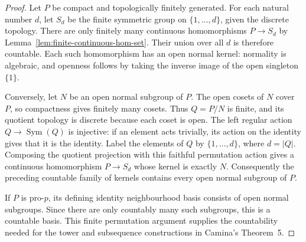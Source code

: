 \begin{proof}
Let $P$ be compact and topologically finitely generated.
For each natural number $d$, let $S_d$ be the finite symmetric
group on $\{1,\ldots,d\}$, given the discrete topology.
There are only finitely many continuous homomorphisms $P\to S_d$
by Lemma~\ref{lem:finite-continuous-hom-set}. Their union over
all $d$ is therefore countable. Each such homomorphism has an
open normal kernel: normality is algebraic, and openness follows
by taking the inverse image of the open singleton $\{1\}$.

Conversely, let $N$ be an open normal subgroup of $P$.
The open cosets of $N$ cover $P$, so compactness gives finitely
many cosets. Thus $Q=P/N$ is finite, and its quotient topology
is discrete because each coset is open. The left regular action
$Q\to\operatorname{Sym}(Q)$ is injective: if an element acts
trivially, its action on the identity gives that it is the identity.
Label the elements of $Q$ by $\{1,\ldots,d\}$, where $d=|Q|$.
Composing the quotient projection with this faithful permutation
action gives a continuous homomorphism $P\to S_d$ whose kernel
is exactly $N$. Consequently the preceding countable family of
kernels contains every open normal subgroup of $P$.

If $P$ is pro-$p$, its defining identity neighbourhood basis
consists of open normal subgroups. Since there are only countably
many such subgroups, this is a countable basis. This finite
permutation argument supplies the countability needed for the
tower and subsequence constructions in Camina's Theorem~5.
\end{proof}

